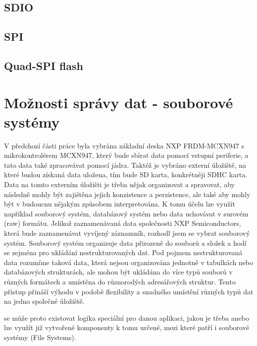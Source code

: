 \subsection{SDIO}

\subsection{SPI}

\subsection{Quad-SPI flash}


\section{Možnosti správy dat - souborové systémy}
V předchozí části práce byla vybrána základní deska NXP FRDM-MCXN947 s mikrokontrolérem MCXN947, který bude sbírat data pomocí vstupní periferie, a tato data také zpracovávat pomocí jádra. Taktéž je vybráno externí úložiště, na které budou získaná data uložena, tím bude SD karta, konkrétněji SDHC karta. Data na tomto externím úložišti je třeba nějak organizovat a spravovat, aby následně mohly být zajištěna jejich konzistence a perzistence, ale také aby mohly být v budoucnu nějakým způsobem interpretována. K tomu účelu lze využít například souborový systém, databázový systém nebo data uchovávat v surovém (raw) formátu. Jelikož zaznamenávaná data společnosti NXP Semiconductors, která bude zaznamenávat vyvíjený záznamník, rozhodl jsem se vybrat souborový systém. Souborový systém organizuje data přirozeně do souborů a složek a hodí se zejména pro ukládání nestrukturovaných dat. Pod pojmem nestrukturovaná data rozumíme taková data, která nejsou organizována jednotně v tabulkách nebo databázových strukturách, ale mohou být ukládána do více typů souborů v různých formátech a umístěna do různorodých adresářových struktur. Tento přístup přináší výhodu v podobě flexibility a snadného umístění různých typů dat na jedno společné úložiště. \cite{weka_structured_unstructured_data, virginia_tech_file_database_systems}

se  může proto existovat logika speciální pro danou aplikaci, jakou je třeba anebo lze využít již vytvořené komponenty k tomu určené, mezi které patří i souborové systémy (File Systems).

